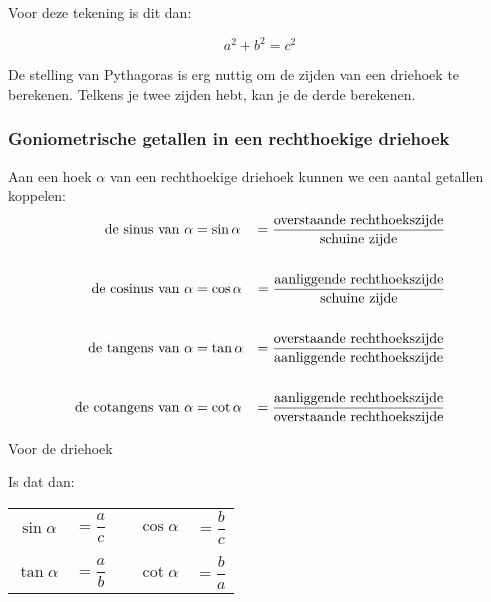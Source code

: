 \begin{figure}[H]
	\centering 
	 
\end{figure}

Voor deze tekening is dit dan:

\[a^2+b^2=c^2\]

De stelling van Pythagoras is erg nuttig om de zijden van een driehoek te berekenen. Telkens je twee zijden hebt, kan je de derde berekenen.

\subsubsection{Goniometrische getallen in een rechthoekige driehoek}

Aan een hoek $\alpha$ van een rechthoekige driehoek kunnen we een aantal getallen koppelen:
\begin{align*}
\textup{de sinus van }\alpha &=\sin \alpha &= \frac{\textup{overstaande rechthoekszijde}}{\textup{schuine zijde}}\\
&&\\
\textup{de cosinus van }\alpha &=\cos \alpha &= \frac{\textup{aanliggende rechthoekszijde}}{\textup{schuine zijde}}\\
&&\\
\textup{de tangens van }\alpha &=\tan \alpha &= \frac{\textup{overstaande rechthoekszijde}}{\textup{aanliggende rechthoekszijde}}\\
&&\\
\textup{de cotangens van }\alpha &=\cot \alpha &= \frac{\textup{aanliggende rechthoekszijde}}{\textup{overstaande rechthoekszijde}}
\end{align*}

Voor de driehoek

\begin{figure}[H]
	\centering 
	 
\end{figure}

Is dat dan:

\begin{center}
\begin{tabular}{ccccc}
$\sin \alpha$ &$= \dfrac{a}{c}$ &\qquad\qquad\qquad& $\cos \alpha$ &$= \dfrac{b}{c}$\\
&&&&\\
$\tan \alpha$ &$= \dfrac{a}{b}$ &\qquad\qquad\qquad& $\cot \alpha$ &$= \dfrac{b}{a}$
\end{tabular}
\end{center}

